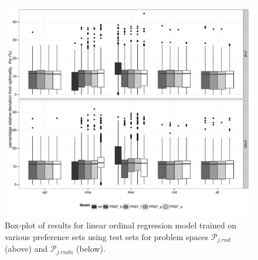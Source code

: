 \documentclass[smallextended]{llncs}
\begin{document}
\begin{figure}[t]\centering 
\includegraphics[width=\columnwidth]{figures/boxplot} 
\caption{Box-plot of results for linear ordinal regression model trained on various preference sets using test sets for problem spaces $\mathcal{P}_{j.rnd}$ (above) and $\mathcal{P}_{j.rndn}$ (below).  }
\label{fig:results}
\end{figure}
 
\end{document}
